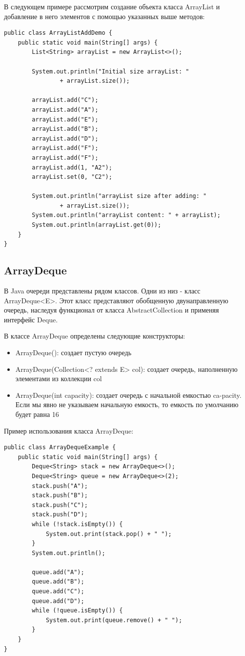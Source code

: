 В следующем примере рассмотрим создание объекта класса ArrayList и добавление в него элементов с помощью указанных выше методов:

\begin{lstlisting}
public class ArrayListAddDemo {
    public static void main(String[] args) {
        List<String> arrayList = new ArrayList<>();

        System.out.println("Initial size arrayList: "
                + arrayList.size());

        arrayList.add("C");
        arrayList.add("A");
        arrayList.add("E");
        arrayList.add("B");
        arrayList.add("D");
        arrayList.add("F");
        arrayList.add("F");
        arrayList.add(1, "A2");
        arrayList.set(0, "C2");

        System.out.println("arrayList size after adding: "
                + arrayList.size());
        System.out.println("arrayList content: " + arrayList);
        System.out.println(arrayList.get(0));
    }
}
\end{lstlisting}

\subsection{ArrayDeque}

В Java очереди представлены рядом классов. Одни из низ - класс ArrayDeque<E>. Этот класс представляют обобщенную двунаправленную очередь, наследуя функционал от класса AbstractCollection и применяя интерфейс Deque.

В классе ArrayDeque определены следующие конструкторы:
\begin{itemize}
\item ArrayDeque(): создает пустую очередь
\item ArrayDeque(Collection<? extends E> col): создает очередь, наполненную элементами из коллекции col
\item ArrayDeque(int capacity): создает очередь с начальной емкостью ca-\newline pacity. Если мы явно не указываем начальную емкость, то емкость по умолчанию будет равна 16
\end{itemize}

Пример использования класса ArrayDeque:

\begin{lstlisting}
public class ArrayDequeExample {
    public static void main(String[] args) {
        Deque<String> stack = new ArrayDeque<>();
        Deque<String> queue = new ArrayDeque<>(2);
        stack.push("A");
        stack.push("B");
        stack.push("C");
        stack.push("D");
        while (!stack.isEmpty()) {
            System.out.print(stack.pop() + " ");
        }
        System.out.println();

        queue.add("A");
        queue.add("B");
        queue.add("C");
        queue.add("D");
        while (!queue.isEmpty()) {
            System.out.print(queue.remove() + " ");
        }
    }
} 
\end{lstlisting}

